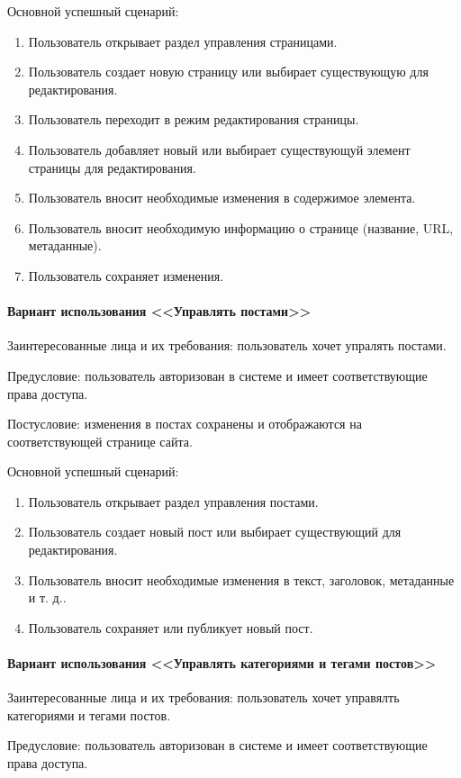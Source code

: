 Основной успешный сценарий:
\begin{enumerate}
	\item Пользователь открывает раздел управления страницами.
	\item Пользователь создает новую страницу или выбирает существующую для редактирования.
	\item Пользователь переходит в режим редактирования страницы.
	\item Пользователь добавляет новый или выбирает существующуй элемент страницы для редактирования.
	\item Пользователь вносит необходимые изменения в содержимое элемента.
	\item Пользователь вносит необходимую информацию о странице (название, URL, метаданные).
	\item Пользователь сохраняет изменения.
\end{enumerate}

\paragraph{Вариант использования <<Управлять постами>>}
Заинтересованные лица и их требования: пользователь хочет упралять постами.

Предусловие: пользователь авторизован в системе и имеет соответствующие права доступа.

Постусловие: изменения в постах сохранены и отображаются на соответствующей странице сайта.

Основной успешный сценарий:
\begin{enumerate}
	\item Пользователь открывает раздел управления постами.
	\item Пользователь создает новый пост или выбирает существующий для редактирования.
	\item Пользователь вносит необходимые изменения в текст, заголовок, метаданные и т. д..
	\item Пользователь сохраняет или публикует новый пост.
\end{enumerate}

\paragraph{Вариант использования <<Управлять категориями и тегами постов>>}
Заинтересованные лица и их требования: пользователь хочет управялть категориями и тегами постов.

Предусловие: пользователь авторизован в системе и имеет соответствующие права доступа.

